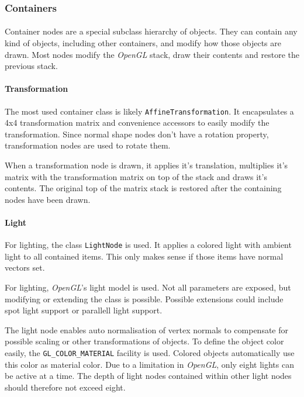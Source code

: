 \subsubsection{Containers\label{ImplContainer}}
\paragraph{}
Container nodes are a special subclass hierarchy of objects.
They can contain any kind of objects, including other containers, and modify how those objects are drawn.
Most nodes modify the \textit{OpenGL} stack, draw their contents and restore the previous stack.

\paragraph{Transformation}
The most used container class is likely \lstinline{AffineTransformation}.
It encapsulates a 4x4 transformation matrix and convenience accessors to easily modify the transformation.
Since normal shape nodes don't have a rotation property, transformation nodes are used to rotate them.

When a transformation node is drawn, it applies it's translation, multiplies it's matrix with the transformation matrix on top of the stack and draws it's contents.
The original top of the matrix stack is restored after the containing nodes have been drawn.

\paragraph{Light}
For lighting, the class \lstinline{LightNode} is used.
It applies a colored light with ambient light to all contained items.
This only makes sense if those items have normal vectors set.

For lighting, \textit{OpenGL}'s light model is used.
Not all parameters are exposed, but modifying or extending the class is possible.
Possible extensions could include spot light support or parallell light support.

The light node enables auto normalisation of vertex normals to compensate for possible scaling or other transformations of objects.
To define the object color easily, the \lstinline{GL_COLOR_MATERIAL} facility is used.
Colored objects automatically use this color as material color.
Due to a limitation in \textit{OpenGL}, only eight lights can be active at a time.
The depth of light nodes contained within other light nodes should therefore not exceed eight.

